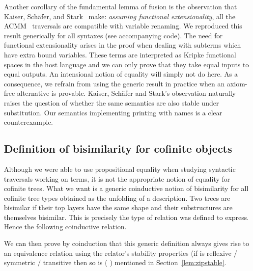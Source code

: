 \begin{agdasnippet}
\end{agdasnippet}

Another corollary of the fundamental lemma of fusion is the observation that
Kaiser, Schäfer, and Stark~\citeyear{Kaiser-wsdebr} make: \emph{assuming
functional extensionality}, all the ACMM~\citeyear{allais2017type} traversals
are compatible with variable renaming.
We reproduced this result generically for all syntaxes (see accompanying code).
The need for functional extensionality arises in the proof when dealing with
subterms which have extra bound variables. These terms are interpreted as
Kripke functional spaces in the host language and we can only prove that they
take equal inputs to equal outputs. An intensional notion of equality will
simply not do here.
As a consequence, we refrain from using the generic result in practice when
an axiom-free alternative is provable. Kaiser, Schäfer and Stark's observation
naturally raises the question of whether the same semantics are also stable
under substitution. Our semantics implementing printing with names is a clear
counterexample.



\subsection{Definition of bisimilarity for cofinite objects}

Although we were able to use propositional equality when studying
syntactic traversals working on terms, it is not the appropriate
notion of equality for cofinite trees. What we want is a generic
coinductive notion of bisimilarity for all cofinite tree types
obtained as the unfolding of a description. Two trees are bisimilar
if their top layers have the same shape and their substructures are
themselves bisimilar. This is precisely the type of relation 
was defined to express. Hence the following coinductive relation.

\begin{agdasnippet}
\end{agdasnippet}

We can then prove by coinduction that this generic definition always gives
rise to an equivalence relation using the relator's stability properties
(if  is reflexive / symmetric / transitive then so is {(   )}
mentioned in Section~\ref{lem:zipstable}.


